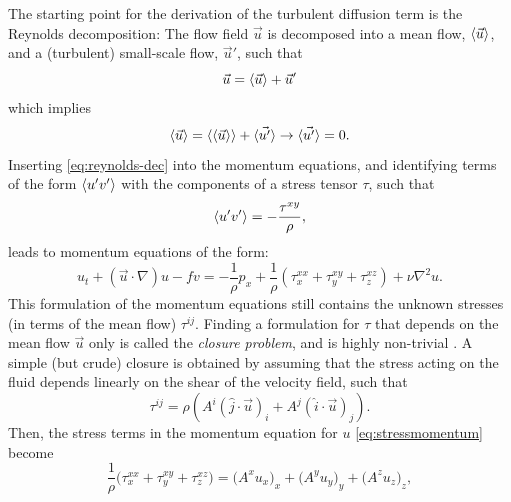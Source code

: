 The starting point for the derivation of the turbulent diffusion term is the Reynolds decomposition: The flow field \(\vec{u}\) is decomposed into a mean flow, \(\langle \vec{u} \rangle\), and a (turbulent) small-scale flow, \(\vec{u}'\), such that
%
\begin{equation}
\vec{u} = \langle \vec{u} \rangle + \vec{u}' \label{eq:reynolds-dec}
\end{equation}
%
which implies
%
\begin{equation}
\langle \vec{u} \rangle = \langle \langle \vec{u} \rangle \rangle + \langle \vec{u'} \rangle \rightarrow \langle \vec{u'} \rangle = 0.
\end{equation}
%
Inserting \eqref{eq:reynolds-dec} into the momentum equations, and identifying terms of the form \(\langle u'v' \rangle\) with the components of a stress tensor \(\tau\), such that \eg
%
\begin{equation}
\langle u'v' \rangle = - \frac{\tau^{xy}}{\rho},
\end{equation}
%
leads to momentum equations of the form:
%
\begin{equation}
u_t + (\vec{u}\cdot\nabla) u - fv = - \frac{1}{\rho} p_x + \frac{1}{\rho} \left( \tau^{xx}_x + \tau^{xy}_y + \tau^{xz}_z \right) + \nu \nabla^2 u.
\label{eq:stressmomentum}
\end{equation}
%
This formulation of the momentum equations still contains the unknown stresses (in terms of the mean flow) \(\tau^{ij}\). Finding a formulation for \(\tau\) that depends on the mean flow \(\vec{u}\) only is called the \emph{closure problem}, and is highly non-trivial \citep{pedloskygfd}. A simple (but crude) closure is obtained by assuming that the stress acting on the fluid depends linearly on the shear of the velocity field, such that
%
\begin{equation}
\tau^{ij} = \rho \left( A^i (\hat{j} \cdot \vec{u})_i + A^j (\hat{i} \cdot \vec{u})_j \right).
\end{equation}
%
Then, the stress terms in the momentum equation for \(u\) \eqref{eq:stressmomentum} become
%
\begin{equation}
\frac{1}{\rho} \bigl( \tau^{xx}_x + \tau^{xy}_y + \tau^{xz}_z \bigr) = \bigl(A^x u_x\bigr)_x + \bigl(A^y u_y\bigr)_y + \bigl(A^z u_z\bigr)_z,
\end{equation}
